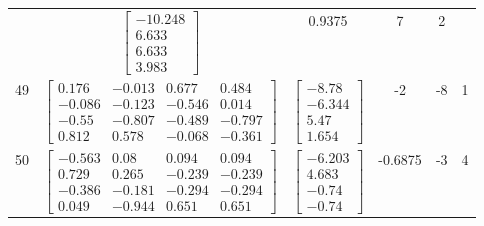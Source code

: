 \documentclass[a4paper,12pt]{article}
\begin{document}
\begin{tabular}{c c c c c c}
&
$\begin{bmatrix} -10.248 \\ 6.633 \\ 6.633 \\ 3.983 \end{bmatrix}$
&
0.9375
&
7
&
2
\\
49
&
$\begin{bmatrix} 0.176 & -0.013 & 0.677 & 0.484 \\ -0.086 & -0.123 & -0.546 & 0.014 \\ -0.55 & -0.807 & -0.489 & -0.797 \\ 0.812 & 0.578 & -0.068 & -0.361 \end{bmatrix}$
&
$\begin{bmatrix} -8.78 \\ -6.344 \\ 5.47 \\ 1.654 \end{bmatrix}$
&
-2
&
-8
&
1
\\
50
&
$\begin{bmatrix} -0.563 & 0.08 & 0.094 & 0.094 \\ 0.729 & 0.265 & -0.239 & -0.239 \\ -0.386 & -0.181 & -0.294 & -0.294 \\ 0.049 & -0.944 & 0.651 & 0.651 \end{bmatrix}$
&
$\begin{bmatrix} -6.203 \\ 4.683 \\ -0.74 \\ -0.74 \end{bmatrix}$
&
-0.6875
&
-3
&
4
\\
\end{tabular} \egroup \newpage
\end{document}
